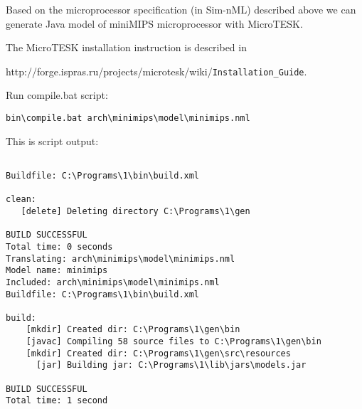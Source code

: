 \documentclass[oneside,final,12pt]{extreport}
\begin{document}
\bigskip

Based on the microprocessor specification (in Sim-nML) described above we can generate Java model of miniMIPS microprocessor with MicroTESK.

\bigskip

The MicroTESK installation instruction is described in

http://forge.ispras.ru/projects/microtesk/wiki/\lstinline!Installation_Guide!.

\bigskip

Run compile.bat script:


\bigskip

\begin{verbatim}
bin\compile.bat arch\minimips\model\minimips.nml
\end{verbatim}


\bigskip


This is script output:


\begin{verbatim}

Buildfile: C:\Programs\1\bin\build.xml

clean:
   [delete] Deleting directory C:\Programs\1\gen

BUILD SUCCESSFUL
Total time: 0 seconds
Translating: arch\minimips\model\minimips.nml
Model name: minimips
Included: arch\minimips\model\minimips.nml
Buildfile: C:\Programs\1\bin\build.xml

build:
    [mkdir] Created dir: C:\Programs\1\gen\bin
    [javac] Compiling 58 source files to C:\Programs\1\gen\bin
    [mkdir] Created dir: C:\Programs\1\gen\src\resources
      [jar] Building jar: C:\Programs\1\lib\jars\models.jar

BUILD SUCCESSFUL
Total time: 1 second


\end{verbatim}
\end{document}
